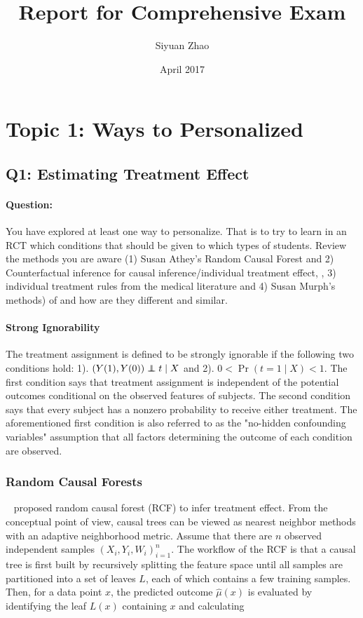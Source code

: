 \documentclass{article}
\title{Report for Comprehensive Exam}
\author{Siyuan Zhao}
\date{April 2017}
\newcommand\independent{\protect\mathpalette{\protect\independenT}{\perp}}
\def\independenT#1#2{\mathrel{\rlap{$#1#2$}\mkern2mu{#1#2}}}
\begin{document}
\maketitle

\tableofcontents

\newpage

\section{Topic 1: Ways to Personalized}
\subsection{Q1: Estimating Treatment Effect}
\paragraph{Question:} You have explored at least one way to personalize.  That is to try to learn in an RCT which conditions that should be given to which types of students.   Review the methods you are aware (1) Susan Athey’s Random Causal Forest and 2) Counterfactual inference for causal inference/individual treatment effect, , 3) individual treatment rules from the medical literature and 4) Susan Murph's methods) of and how are they different and similar.
\\ [0.1in]

\paragraph{Strong Ignorability}
The treatment assignment is defined to be strongly ignorable
\cite{rosenbaum1983central} if the following two conditions hold: 1).
$(Y(1), Y(0)) \independent t\mid X$ and 2). $0 < \Pr (t=1 \mid X) <
1$. The first condition says that treatment assignment is independent
of the potential outcomes conditional on the observed features of subjects. The second condition says that every subject has a nonzero
probability to receive either treatment. The aforementioned first
condition is also referred to as the "no-hidden confounding variables"
assumption that all factors determining the outcome of each condition
are observed.

\subsubsection{Random Causal Forests}~\label{sect:rcf}
\cite{wager2015estimation} proposed random causal forest (RCF) to
infer treatment effect. From the conceptual point of view, causal trees can be viewed as
nearest neighbor methods with an adaptive neighborhood metric. Assume
that there are $n$ observed independent samples $(X_i, Y_i,
W_i)_{i=1}^n$. The workflow of the RCF is that a causal tree is first
built by recursively splitting the feature space until all samples are
partitioned into a set of leaves $L$, each of which contains a few
training samples. Then, for a data point $x$, the predicted outcome $\hat{\mu}(x)$
is evaluated by identifying the leaf $L(x)$ containing $x$ and
calculating
\end{document}
